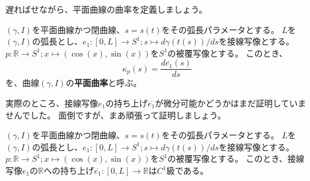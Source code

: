 遅ればせながら、平面曲線の曲率を定義しましょう。
\begin{definition}
  $(\gamma,I)$を平面曲線かつ閉曲線、$s=s(t)$をその弧長パラメータとする。
  $L$を$(\gamma,I)$の弧長とし、$e_1:[0,L]\to S^1;s\mapsto d\gamma(t(s))/ds$を接線写像とする。
  $p:\mathbb{R}\to S^1;x\mapsto(\cos(x),\sin(x))$を$S^1$の被覆写像とする。
  このとき、
  \[
    \kappa_p(s)=\frac{d\overline{e_1}(s)}{ds}
  \]
  を、曲線$(\gamma,I)$の\textbf{平面曲率}と呼ぶ。
\end{definition}

実際のところ、接線写像$e_1$の持ち上げ$\overline{e_1}$が微分可能かどうかはまだ証明していませんでした。
面倒ですが、まあ頑張って証明しましょう。
\begin{theorem}
  $(\gamma,I)$を平面曲線かつ閉曲線、$s=s(t)$をその弧長パラメータとする。
  $L$を$(\gamma,I)$の弧長とし、$e_1:[0,L]\to S^1;s\mapsto d\gamma(t(s))/ds$を接線写像とする。
  $p:\mathbb{R}\to S^1;x\mapsto(\cos(x),\sin(x))$を$S^1$の被覆写像とする。
  このとき、接線写像$e_1$の$\mathbb{R}$への持ち上げ$\overline{e_1}:[0,L]\to\mathbb{R}$は$C^1$級である。
\end{theorem}
